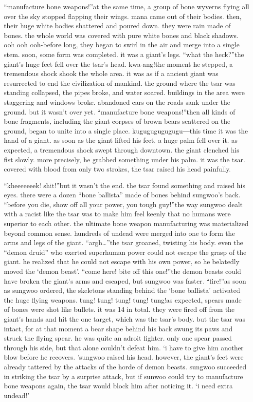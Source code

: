 “manufacture bone weapons!”at the same time, a group of bone wyverns flying all over the sky stopped flapping their wings.
 mana came out of their bodies.
then, their huge white bodies shattered and poured down.
 they were rain made of bones.
the whole world was covered with pure white bones and black shadows.
ooh ooh ooh-before long, they began to swirl in the air and merge into a single stem.
 soon, some form was completed.
it was a giant’s legs.
“what the heck?”the giant’s huge feet fell over the tsar’s head.
kwa-ang!the moment he stepped, a tremendous shock shook the whole area.
 it was as if a ancient giant was resurrected to end the civilization of mankind.
the ground where the tsar was standing collapsed, the pipes broke, and water soared.
 buildings in the area were staggering and windows broke.
 abandoned cars on the roads sank under the ground.
but it wasn’t over yet.
“manufacture bone weapons!”then all kinds of bone fragments, including the giant corpses of brown bears scattered on the ground, began to unite into a single place.
kugugugugugugu―this time it was the hand of a giant.
 as soon as the giant lifted his feet, a huge palm fell over it.
as expected, a tremendous shock swept through downtown.
 the giant clenched his fist slowly.
 more precisely, he grabbed something under his palm.
it was the tsar.
 covered with blood from only two strokes, the tsar raised his head painfully.


“kheeeeeeek! shit!”but it wasn’t the end.
 the tsar found something and raised his eyes.
there were a dozen “bone ballista” made of bones behind sungwoo’s back.
“before you die, show off all your power, you tough guy!”the way sungwoo dealt with a racist like the tsar was to make him feel keenly that no humans were superior to each other.
the ultimate bone weapon manufacturing was materialized beyond common sense.
 hundreds of undead were merged into one to form the arms and legs of the giant.
“argh…”the tsar groaned, twisting his body.
 even the “demon druid” who exerted superhuman power could not escape the grasp of the giant.
he realized that he could not escape with his own power, so he belatedly moved the ‘demon beast’.
“come here! bite off this one!”the demon beasts could have broken the giant’s arms and escaped, but sungwoo was faster.
“fire!”as soon as sungwoo ordered, the skeletons standing behind the ‘bone ballista’ activated the huge flying weapons.
tung! tung! tung! tung! tung!as expected, spears made of bones were shot like bullets.
 it was 14 in total.
 they were fired off from the giant’s hands and hit the one target, which was the tsar’s body.
but the tsar was intact, for at that moment a bear shape behind his back swung its paws and struck the flying spear.
 he was quite an adroit fighter.
only one spear passed through his side, but that alone couldn’t defeat him.
‘i have to give him another blow before he recovers.
’sungwoo raised his head.
 however, the giant’s feet were already tattered by the attacks of the horde of demon beasts.
sungwoo succeeded in striking the tsar by a surprise attack, but if sunwoo could try to manufacture bone weapons again, the tsar would block him after noticing it.
‘i need extra undead!’

 
